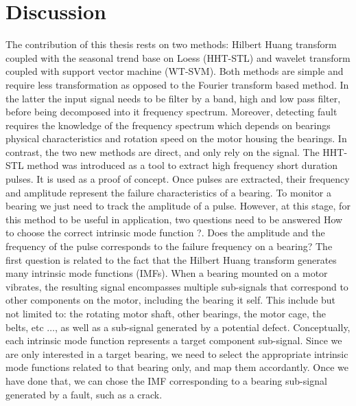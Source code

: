 \documentclass[thesis.tex]{subfiles}
\begin{document}
	\section{Discussion}
	\label{sec:discussion}
	The contribution of this thesis rests on two methods: Hilbert Huang transform coupled with the seasonal trend base on Loess (HHT-STL) and wavelet transform coupled with support vector machine (WT-SVM). Both methods are simple and require less transformation as opposed to the Fourier transform based method. In the latter the input signal needs to be filter by a band, high and low pass filter, before being decomposed into it frequency spectrum. Moreover, detecting fault requires the knowledge of the frequency spectrum which depends on bearings physical characteristics and rotation speed on the motor housing the bearings. In contrast, the two new methods are direct, and only rely on the signal.
	\justify
	The HHT-STL method was introduced as a tool to extract high frequency short duration pulses. It is used as a proof of concept. Once pulses are extracted, their frequency and amplitude represent the failure characteristics of a bearing. To monitor a bearing we just need to track the amplitude of a pulse. However, at this stage, for this method to be useful in application, two questions need to be answered 
	\justify
	How to choose the correct intrinsic mode function ?. Does the amplitude and the frequency of the pulse corresponds to the failure frequency on a bearing? 
	The first question is related to the fact that the Hilbert Huang transform generates many intrinsic mode functions (IMFs). When a bearing mounted on a motor vibrates, the resulting signal encompasses multiple sub-signals that correspond to other components on the motor, including the bearing it self. This include but not limited to: the rotating motor shaft, other bearings, the motor cage, the belts, etc $\dots$, as well as a sub-signal generated by a potential defect. Conceptually, each intrinsic mode function represents a target component sub-signal.
	Since we are only interested in a target bearing, we need to select the appropriate intrinsic mode functions related to that bearing only, and map them accordantly. Once we have done that, we can chose the IMF corresponding to a bearing sub-signal generated by a fault, such as a crack.
\end{document}
